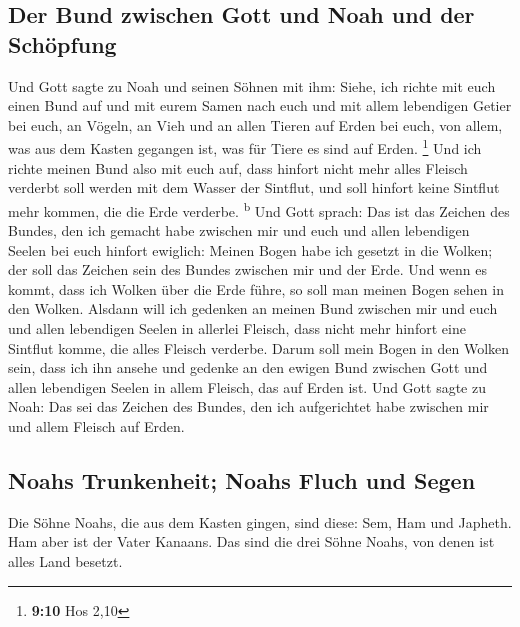 \hypertarget{der-bund-zwischen-gott-und-noah-und-der-schuxf6pfung}{%
\subsection{Der Bund zwischen Gott und Noah und der
Schöpfung}\label{der-bund-zwischen-gott-und-noah-und-der-schuxf6pfung}}

 Und Gott sagte zu Noah und seinen Söhnen mit ihm:
 Siehe, ich richte mit euch einen Bund auf und mit eurem
Samen nach euch  und mit allem lebendigen Getier bei
euch, an Vögeln, an Vieh und an allen Tieren auf Erden bei euch, von
allem, was aus dem Kasten gegangen ist, was für Tiere es sind auf Erden.
\footnote{\textbf{9:10} Hos 2,10}  Und ich richte meinen
Bund also mit euch auf, dass hinfort nicht mehr alles Fleisch verderbt
soll werden mit dem Wasser der Sintflut, und soll hinfort keine Sintflut
mehr kommen, die die Erde verderbe. \textsuperscript{b} 
Und Gott sprach: Das ist das Zeichen des Bundes, den ich gemacht habe
zwischen mir und euch und allen lebendigen Seelen bei euch hinfort
ewiglich:  Meinen Bogen habe ich gesetzt in die Wolken;
der soll das Zeichen sein des Bundes zwischen mir und der Erde.
 Und wenn es kommt, dass ich Wolken über die Erde führe,
so soll man meinen Bogen sehen in den Wolken.  Alsdann
will ich gedenken an meinen Bund zwischen mir und euch und allen
lebendigen Seelen in allerlei Fleisch, dass nicht mehr hinfort eine
Sintflut komme, die alles Fleisch verderbe.  Darum soll
mein Bogen in den Wolken sein, dass ich ihn ansehe und gedenke an den
ewigen Bund zwischen Gott und allen lebendigen Seelen in allem Fleisch,
das auf Erden ist.  Und Gott sagte zu Noah: Das sei das
Zeichen des Bundes, den ich aufgerichtet habe zwischen mir und allem
Fleisch auf Erden.

\hypertarget{noahs-trunkenheit-noahs-fluch-und-segen}{%
\subsection{Noahs Trunkenheit; Noahs Fluch und
Segen}\label{noahs-trunkenheit-noahs-fluch-und-segen}}

 Die Söhne Noahs, die aus dem Kasten gingen, sind diese:
Sem, Ham und Japheth. Ham aber ist der Vater Kanaans. 
Das sind die drei Söhne Noahs, von denen ist alles Land besetzt.

